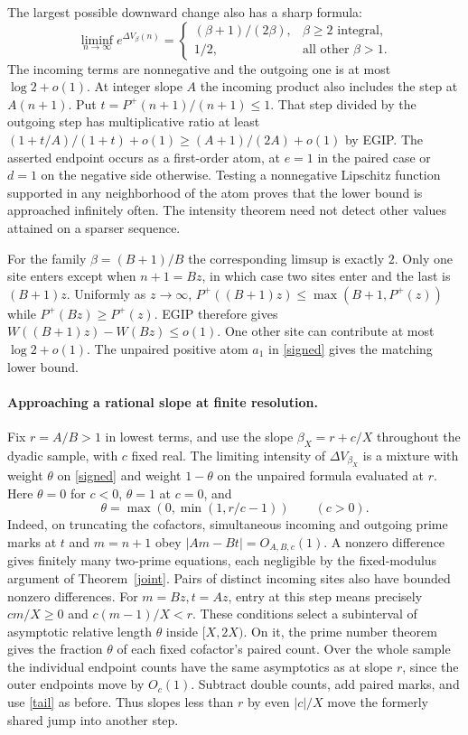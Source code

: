 \documentclass[10pt]{article}
\begin{document}
The largest possible downward change also has a sharp formula:
\[
 \liminf_{n\to\infty} e^{\Delta V_\beta(n)}
 =\begin{cases}(\beta+1)/(2\beta),&\beta\ge2\text{ integral},\\
                 1/2,&\text{all other }\beta>1 .
   \end{cases}
\]
The incoming terms are nonnegative and the outgoing one is at most $\log 2+o(1)$. At integer slope $A$ the incoming product also includes the step at $A(n+1)$. Put $t=P^+(n+1)/(n+1)\le1$. That step divided by the outgoing step has multiplicative ratio at least $(1+t/A)/(1+t)+o(1)\ge(A+1)/(2A)+o(1)$ by EGIP. The asserted endpoint occurs as a first-order atom, at $e=1$ in the paired case or $d=1$ on the negative side otherwise. Testing a nonnegative Lipschitz function supported in any neighborhood of the atom proves that the lower bound is approached infinitely often. The intensity theorem need not detect other values attained on a sparser sequence.

For the family $\beta=(B+1)/B$ the corresponding limsup is exactly $2$. Only one site enters except when $n+1=Bz$, in which case two sites enter and the last is $(B+1)z$. Uniformly as $z\to\infty$, $P^+((B+1)z)\le\max(B+1,P^+(z))$ while $P^+(Bz)\ge P^+(z)$. EGIP therefore gives $W((B+1)z)-W(Bz)\le o(1)$. One other site can contribute at most $\log 2+o(1)$. The unpaired positive atom $a_1$ in \eqref{signed} gives the matching lower bound.

\paragraph{Approaching a rational slope at finite resolution.}
Fix $r=A/B>1$ in lowest terms, and use the slope $\beta_X=r+c/X$ throughout the dyadic sample, with $c$ fixed real. The limiting intensity of $\Delta V_{\beta_X}$ is a mixture with weight $\theta$ on \eqref{signed} and weight $1-\theta$ on the unpaired formula evaluated at $r$. Here $\theta=0$ for $c<0$, $\theta=1$ at $c=0$, and
\[
 \theta=\max(0,\min(1,r/c-1))\qquad(c>0).
\]
Indeed, on truncating the cofactors, simultaneous incoming and outgoing prime marks at $t$ and $m=n+1$ obey $|Am-Bt|=O_{A,B,c}(1)$. A nonzero difference gives finitely many two-prime equations, each negligible by the fixed-modulus argument of Theorem~\ref{joint}. Pairs of distinct incoming sites also have bounded nonzero differences. For $m=Bz,t=Az$, entry at this step means precisely $cm/X\ge0$ and $c(m-1)/X<r$. These conditions select a subinterval of asymptotic relative length $\theta$ inside $[X,2X)$. On it, the prime number theorem gives the fraction $\theta$ of each fixed cofactor's paired count. Over the whole sample the individual endpoint counts have the same asymptotics as at slope $r$, since the outer endpoints move by $O_c(1)$. Subtract double counts, add paired marks, and use \eqref{tail} as before. Thus slopes less than $r$ by even $|c|/X$ move the formerly shared jump into another step.
\end{document}
